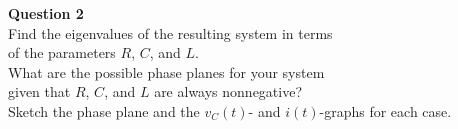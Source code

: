 \documentclass[preview]{standalone}
\begin{document}
\begin{center}
\raggedright
            \textbf{Question 2} \\[10pt]
            Find the eigenvalues of the resulting system in terms \\  
            of the parameters $R$, $C$, and $L$. \\[5pt]
            What are the possible phase planes for your system \\
            given that $R$, $C$, and $L$ are always nonnegative? \\[5pt]
            Sketch the phase plane and the $v_C(t)$- and $i(t)$-graphs for each case.
\end{center}
\end{document}
